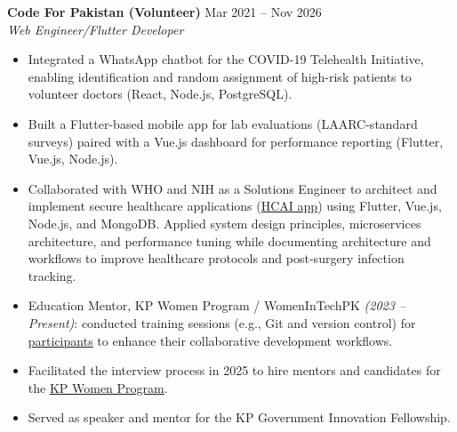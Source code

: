 \documentclass{res} %
\begin{document}
\begin{resume}
  \textbf{Code For Pakistan (Volunteer)} \hfill Mar 2021 -- Nov 2026\\
  {\sl Web Engineer/Flutter Developer}
  \begin{itemize}
    \item Integrated a WhatsApp chatbot for the COVID-19 Telehealth Initiative, enabling identification and random assignment of high-risk patients to volunteer doctors (React, Node.js, PostgreSQL).
    \item Built a Flutter-based mobile app for lab evaluations (LAARC-standard surveys) paired with a Vue.js dashboard for performance reporting (Flutter, Vue.js, Node.js).
    \item Collaborated with WHO and NIH as a Solutions Engineer to architect and implement secure healthcare applications (\href{https://apps.apple.com/pk/app/hcai-surveillance-app/id1618890798}{HCAI app}) using Flutter, Vue.js, Node.js, and MongoDB. Applied system design principles, microservices architecture, and performance tuning while documenting architecture and workflows to improve healthcare protocols and post-surgery infection tracking.
    \item Education Mentor, KP Women Program / WomenInTechPK \textit{(2023 -- Present)}: conducted training sessions (e.g., Git and version control) for \href{https://github.com/codeforpakistan/first-commit}{participants} to enhance their collaborative development workflows.
    \item Facilitated the interview process in 2025 to hire mentors and candidates for the \href{https://codeforpakistan.org/programs/internships/kp-women}{KP Women Program}.
    \item Served as speaker and mentor for the KP Government Innovation Fellowship.
  \end{itemize}


\end{resume}
\end{document}
